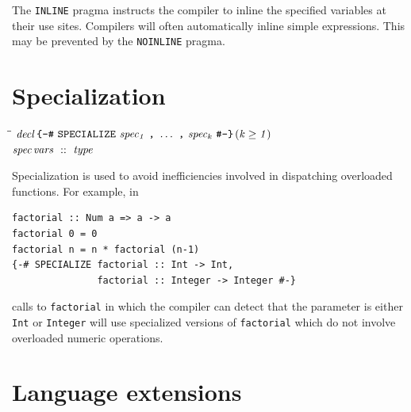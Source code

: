 The \mbox{\tt INLINE} pragma instructs the compiler to inline the specified variables
at their use sites.
Compilers will often automatically inline simple expressions.  This
may be prevented by the \mbox{\tt NOINLINE} pragma.

\section{Specialization}
\begin{flushleft}\it\begin{tabbing}
\hspace{0.6in}\=\hspace{3.1in}\=\kill
$\it decl$\>\makebox[3.5em]{$\rightarrow$}$\it \makebox{\tt {\char'173}-{\char'43}}\ \makebox{\tt SPECIALIZE}\ spec_1\ \makebox{\tt ,}\ \ldots \ \makebox{\tt ,}\ spec_k\ \makebox{\tt {\char'43}-{\char'175}}$\>\makebox[3em]{}$\it (k\geq 1)$\\ 
$\it spec$\>\makebox[3.5em]{$\rightarrow$}$\it vars\ ::\ type$
\end{tabbing}\end{flushleft}
Specialization is used to avoid inefficiencies involved in dispatching
overloaded functions.  For example, in
\bprog
{\small\begin{verbatim}
factorial :: Num a => a -> a
factorial 0 = 0
factorial n = n * factorial (n-1)
{-# SPECIALIZE factorial :: Int -> Int,
               factorial :: Integer -> Integer #-}
\end{verbatim}}
\eprog
calls to \mbox{\tt factorial} in which the compiler can detect that the
parameter is either \mbox{\tt Int} or \mbox{\tt Integer} will
use specialized versions of \mbox{\tt factorial} which do not involve
overloaded numeric operations.

\section{Language extensions}


